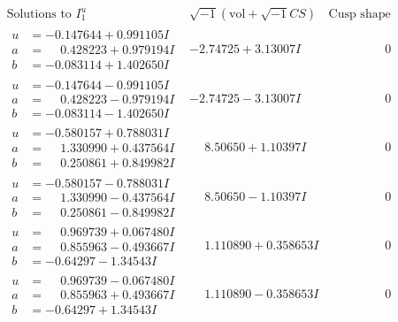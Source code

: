 \documentclass[1p]{elsarticle_modified}
\theoremstyle{definition}
\newcommand{\I}{\sqrt{-1}}
\begin{document}
$$\begin{array}{c|c|c}  
\text{Solutions to }I^u_{1}& \I (\text{vol} + \sqrt{-1}CS) & \text{Cusp shape}\\
 \hline 
\begin{aligned}
u &= -0.147644 + 0.991105 I \\
a &= \phantom{-}0.428223 + 0.979194 I \\
b &= -0.083114 + 1.402650 I\end{aligned}
 & -2.74725 + 3.13007 I & \phantom{-0.000000 } 0 \\ \hline\begin{aligned}
u &= -0.147644 - 0.991105 I \\
a &= \phantom{-}0.428223 - 0.979194 I \\
b &= -0.083114 - 1.402650 I\end{aligned}
 & -2.74725 - 3.13007 I & \phantom{-0.000000 } 0 \\ \hline\begin{aligned}
u &= -0.580157 + 0.788031 I \\
a &= \phantom{-}1.330990 + 0.437564 I \\
b &= \phantom{-}0.250861 + 0.849982 I\end{aligned}
 & \phantom{-}8.50650 + 1.10397 I & \phantom{-0.000000 } 0 \\ \hline\begin{aligned}
u &= -0.580157 - 0.788031 I \\
a &= \phantom{-}1.330990 - 0.437564 I \\
b &= \phantom{-}0.250861 - 0.849982 I\end{aligned}
 & \phantom{-}8.50650 - 1.10397 I & \phantom{-0.000000 } 0 \\ \hline\begin{aligned}
u &= \phantom{-}0.969739 + 0.067480 I \\
a &= \phantom{-}0.855963 - 0.493667 I \\
b &= -0.64297 - 1.34543 I\end{aligned}
 & \phantom{-}1.110890 + 0.358653 I & \phantom{-0.000000 } 0 \\ \hline\begin{aligned}
u &= \phantom{-}0.969739 - 0.067480 I \\
a &= \phantom{-}0.855963 + 0.493667 I \\
b &= -0.64297 + 1.34543 I\end{aligned}
 & \phantom{-}1.110890 - 0.358653 I & \phantom{-0.000000 } 0 \\ \hline\begin{aligned}

\end{aligned}
\end{array}$$
\end{document}
